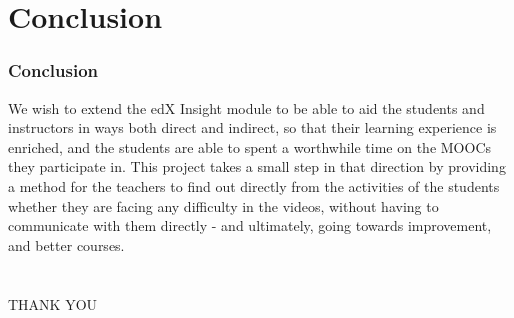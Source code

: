 \documentclass[12pt,xcolor=dvipsnames]{beamer}
\begin{document}
\section{Conclusion}
\begin{frame}[t]
\frametitle{Conclusion}


We wish to extend the edX Insight module to be able to aid the students and instructors in ways both direct and indirect, so that their learning experience is enriched, and the students are able to spent a worthwhile time on the MOOCs they participate in. This project takes a small step in that direction by providing a method for the teachers to find out directly from the activities of the students whether they are facing any difficulty in the videos, without having to communicate with them directly - and ultimately, going towards improvement, and better courses. 

\end{frame}




\section{}
\frametitle{}
\begin{frame}[t]

\vspace*{\fill}

\begin{center}
\begin{Huge}THANK YOU\end{Huge}
\end{center}

\vspace*{\fill}

\end{frame}
\end{document}
